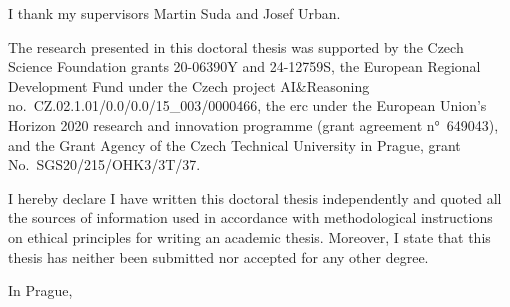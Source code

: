 \begin{thanks}
I thank my supervisors Martin Suda and Josef Urban.



The research presented in this doctoral thesis was supported by
the Czech Science Foundation grants 20-06390Y and 24-12759S,
the European Regional Development Fund under the Czech project AI\&Reasoning no.~CZ.02.1.01/0.0/0.0/15\_003/0000466,
the \gls{erc} under the European Union's Horizon 2020 research and innovation programme (grant agreement n°~649043), and
the Grant Agency of the Czech Technical University in Prague, grant No.~SGS20/215/OHK3/3T/37.
\end{thanks}

\begin{declaration}
I hereby declare I have written this doctoral thesis independently and quoted all the sources of information used in accordance with methodological instructions on ethical principles for writing an academic thesis. Moreover, I state that this thesis has neither been submitted nor accepted for any other degree.

In Prague, ~~
\end{declaration}

